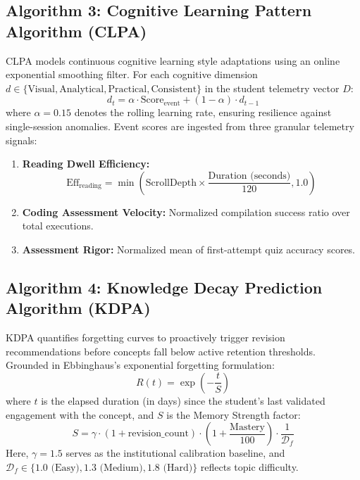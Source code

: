 \documentclass[11pt,a4paper]{article}
\begin{document}
\subsection{Algorithm 3: Cognitive Learning Pattern Algorithm (CLPA)}
CLPA models continuous cognitive learning style adaptations using an online exponential smoothing filter. For each cognitive dimension $d \in \{\text{Visual}, \text{Analytical}, \text{Practical}, \text{Consistent}\}$ in the student telemetry vector $D$:
\begin{equation}
d_t = \alpha \cdot \text{Score}_{\text{event}} + (1 - \alpha) \cdot d_{t-1}
\label{eq:clpa}
\end{equation}
where $\alpha = 0.15$ denotes the rolling learning rate, ensuring resilience against single-session anomalies. Event scores are ingested from three granular telemetry signals:
\begin{enumerate}
    \item \textbf{Reading Dwell Efficiency:}
    \begin{equation}
        \text{Eff}_{\text{reading}} = \min\left( \text{ScrollDepth} \times \frac{\text{Duration (seconds)}}{120}, 1.0 \right)
    \end{equation}
    \item \textbf{Coding Assessment Velocity:} Normalized compilation success ratio over total executions.
    \item \textbf{Assessment Rigor:} Normalized mean of first-attempt quiz accuracy scores.
\end{enumerate}

\subsection{Algorithm 4: Knowledge Decay Prediction Algorithm (KDPA)}
KDPA quantifies forgetting curves to proactively trigger revision recommendations before concepts fall below active retention thresholds. Grounded in Ebbinghaus's exponential forgetting formulation:
\begin{equation}
R(t) = \exp\left( -\frac{t}{S} \right)
\label{eq:kdpa_retention}
\end{equation}
where $t$ is the elapsed duration (in days) since the student's last validated engagement with the concept, and $S$ is the Memory Strength factor:
\begin{equation}
S = \gamma \cdot (1 + \text{revision\_count}) \cdot \left( 1 + \frac{\text{Mastery}}{100} \right) \cdot \frac{1}{\mathcal{D}_f}
\label{eq:kdpa_strength}
\end{equation}
Here, $\gamma = 1.5$ serves as the institutional calibration baseline, and $\mathcal{D}_f \in \{1.0 \text{ (Easy)}, 1.3 \text{ (Medium)}, 1.8 \text{ (Hard)}\}$ reflects topic difficulty.
\end{document}
